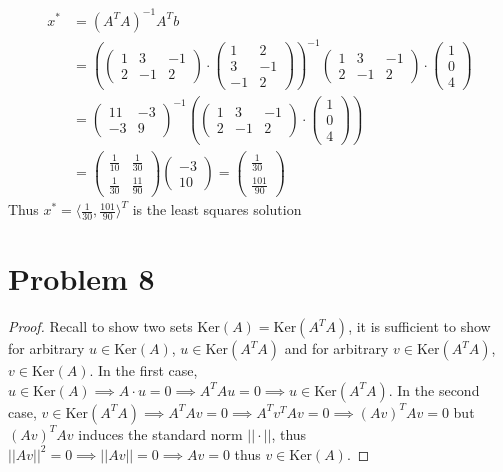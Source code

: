 \documentclass{article}
\begin{document}
\begin{align*}
    x^{*} &= (A^{T}A)^{-1}A^{T}b\\
    &= \left(\begin{pmatrix}
        1 & 3 & -1\\
        2 & -1 & 2
    \end{pmatrix}\cdot \begin{pmatrix}
        1 & 2\\
        3 & -1\\
        -1 & 2
    \end{pmatrix}\right)^{-1}\begin{pmatrix}
        1 & 3 & -1\\
        2 & -1 & 2
    \end{pmatrix}\cdot \begin{pmatrix}
        1\\
        0\\
        4
    \end{pmatrix} \\
    &= \begin{pmatrix}
        11 & -3\\
        -3 & 9
    \end{pmatrix}^{-1}\left(\begin{pmatrix}
        1 & 3 & -1\\
        2 & -1 & 2
    \end{pmatrix}\cdot \begin{pmatrix}
        1\\
        0\\
        4
    \end{pmatrix}\right)\\
    &= \begin{pmatrix}
    \frac{1}{10} & \frac{1}{30}\\
    \frac{1}{30} & \frac{11}{90}
    \end{pmatrix}\begin{pmatrix}
        -3\\
        10
    \end{pmatrix} = \begin{pmatrix}
        \frac{1}{30}\\
        \frac{101}{90}
    \end{pmatrix}
\end{align*}
Thus $x^{*} = \langle \frac{1}{30}, \frac{101}{90}\rangle^{T}$ is the least squares solution
\section*{Problem 8}
\begin{proof}
    Recall to show two sets $\text{Ker}(A) = \text{Ker}(A^{T}A)$, it is sufficient to show for arbitrary $u \in \text{Ker}(A)$, $u \in \text{Ker}(A^{T}A)$ and for arbitrary $v \in \text{Ker}(A^{T}A)$, $v \in \text{Ker}(A)$. In the first case, $u \in \text{Ker}(A) \implies A\cdot u = 0 \implies A^{T}Au = 0 \implies u \in \text{Ker}(A^{T}A)$. In the second case, $v \in \text{Ker}(A^{T}A) \implies A^{T}Av = 0 \implies A^{T}v^{T}Av = 0 \implies (Av)^{T}Av = 0$ but $(Av)^{T}Av$ induces the standard norm $||\cdot ||$, thus $||Av||^{2} = 0 \implies ||Av|| = 0 \implies Av=  0$ thus $v \in \text{Ker}(A)$. 
\end{proof}
\end{document}

